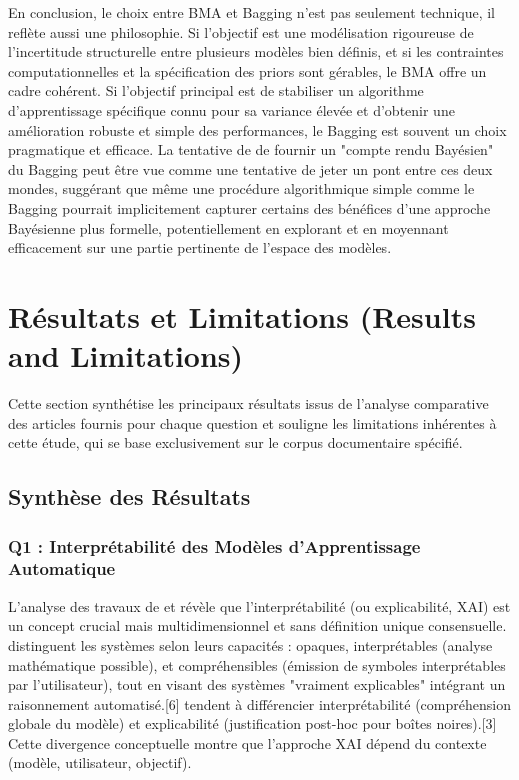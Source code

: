 \documentclass[11pt,a4paper]{article}
\begin{document}
En conclusion, le choix entre BMA et Bagging n'est pas seulement technique, il reflète aussi une philosophie. Si l'objectif est une modélisation rigoureuse de l'incertitude structurelle entre plusieurs modèles bien définis, et si les contraintes computationnelles et la spécification des priors sont gérables, le BMA offre un cadre cohérent. Si l'objectif principal est de stabiliser un algorithme d'apprentissage spécifique connu pour sa variance élevée et d'obtenir une amélioration robuste et simple des performances, le Bagging est souvent un choix pragmatique et efficace. La tentative de \citet{Domingos1997} de fournir un "compte rendu Bayésien" du Bagging peut être vue comme une tentative de jeter un pont entre ces deux mondes, suggérant que même une procédure algorithmique simple comme le Bagging pourrait implicitement capturer certains des bénéfices d'une approche Bayésienne plus formelle, potentiellement en explorant et en moyennant efficacement sur une partie pertinente de l'espace des modèles.

\section{Résultats et Limitations (Results and Limitations)}

Cette section synthétise les principaux résultats issus de l'analyse comparative des articles fournis pour chaque question et souligne les limitations inhérentes à cette étude, qui se base exclusivement sur le corpus documentaire spécifié.

\subsection{Synthèse des Résultats}

\subsubsection{Q1 : Interprétabilité des Modèles d'Apprentissage Automatique}
L'analyse des travaux de \citet{Doran2017} et \citet{Burkart2021} révèle que l'interprétabilité (ou explicabilité, XAI) est un concept crucial mais multidimensionnel et sans définition unique consensuelle. \citet{Doran2017} distinguent les systèmes selon leurs capacités : opaques, interprétables (analyse mathématique possible), et compréhensibles (émission de symboles interprétables par l'utilisateur), tout en visant des systèmes "vraiment explicables" intégrant un raisonnement automatisé.[6] \citet{Burkart2021} tendent à différencier interprétabilité (compréhension globale du modèle) et explicabilité (justification post-hoc pour boîtes noires).[3] Cette divergence conceptuelle montre que l'approche XAI dépend du contexte (modèle, utilisateur, objectif).
\end{document}
